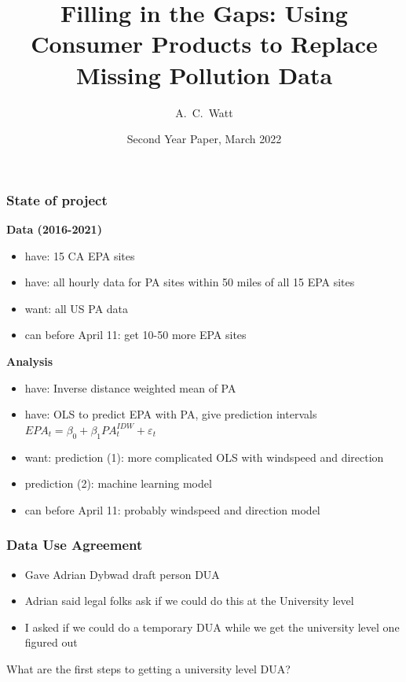 \documentclass{beamer}
\title[Missing Pollution Data] %
{Filling in the Gaps: Using Consumer Products to Replace Missing Pollution Data}
\author[Watt, Aaron] %
{A.~C.~Watt\inst{1}}
\institute[UCB] %
{
  \inst{1}%
  Agricultural \& Resource Economics\\
  University of California, Berkeley
}
\date[SYP 2022] %
{Second Year Paper, March 2022}
\begin{document}
\frame{\titlepage}


\begin{frame}
\frametitle{State of project}
\textbf{Data (2016-2021)} 

\begin{itemize}
    \item have: 15 CA EPA sites
    \item have: all hourly data for PA sites within 50 miles of all 15 EPA sites
    \item want: all US PA data
    \item can before April 11: get 10-50 more EPA sites
\end{itemize}
\vspace{2em}
\textbf{Analysis}
\begin{itemize}
\item have: Inverse distance weighted mean of PA
\item have: OLS to predict EPA with PA, give prediction intervals\\
$EPA_t = \beta_0 + \beta_1 PA^{IDW}_t + \varepsilon_t
$
\item want: prediction (1): more complicated OLS with windspeed and direction
\item prediction (2): machine learning model
\item can before April 11: probably windspeed and direction model
\end{itemize}

\end{frame}



\begin{frame}
\frametitle{Data Use Agreement}

\begin{itemize}
    \item Gave Adrian Dybwad draft person DUA
    \item Adrian said legal folks ask if we could do this at the University level
    \item I asked if we could do a temporary DUA while we get the university level one figured out
\end{itemize}

What are the first steps to getting a university level DUA?

\end{frame}
\end{document}
